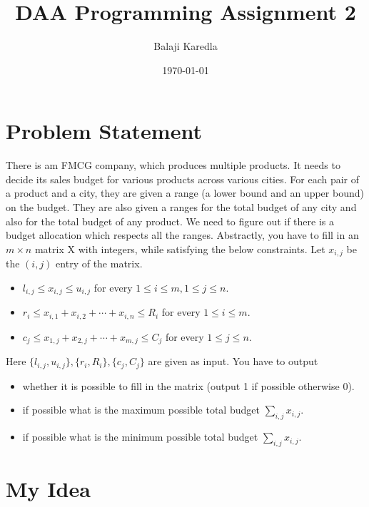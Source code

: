 \documentclass{article}
\title{DAA Programming Assignment 2}
\author{Balaji Karedla}
\date{\today}
\begin{document}

\fancyhead{}

\maketitle

\section{Problem Statement}


There is am FMCG company, which produces multiple products. It needs to decide its sales budget for
various products across various cities. For each pair of a product and a city, they are given a range (a lower
bound and an upper bound) on the budget. They are also given a ranges for the total budget of any city
and also for the total budget of any product. We need to figure out if there is a budget allocation which
respects all the ranges.
Abstractly, you have to fill in an $m \times n$ matrix X with integers, while satisfying the below constraints.
Let $x_{i,j}$ be the $(i, j)$ entry of the matrix.

\begin{itemize}
    \item $l_{i,j} \le x_{i,j} \le u_{i,j}$ for every $1 \le i \le m, 1 \le j \le n$.
    \item $r_i \le x_{i,1} + x_{i,2} + \cdots + x_{i,n} \le R_i$ for every $1 \le i \le m$.
    \item $c_j \le x_{1,j} + x_{2,j} + \cdots + x_{m,j} \le C_j$ for every $1 \le j \le n$.
\end{itemize}

Here $\{l_{i,j} , u_{i,j} \}, \{r_i, R_i\}, \{c_j , C_j \}$ are given as input. You have to output
\begin{itemize}
    \item whether it is possible to fill in the matrix (output 1 if possible otherwise 0).
    \item if possible what is the maximum possible total budget $\sum_{i, j} x_{i, j}$.
    \item if possible what is the minimum possible total budget $\sum_{i, j} x_{i, j}$.
\end{itemize}

\section{My Idea}
\end{document}
